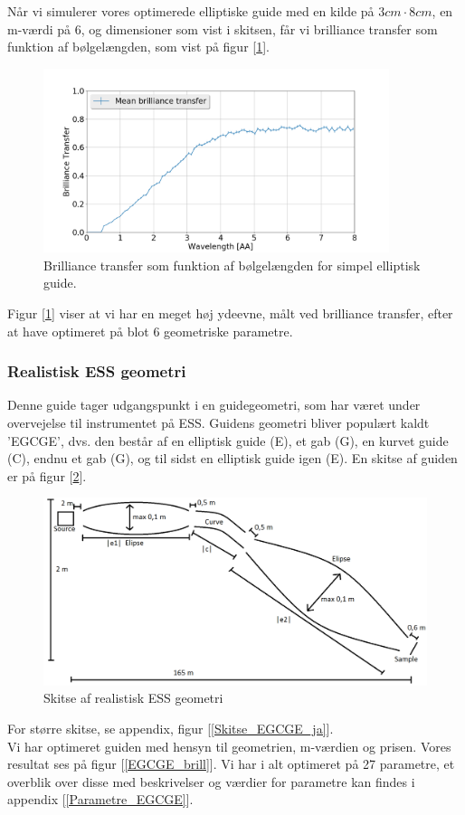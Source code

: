 \documentclass[12pt,oneside,a4paper]{article}
\begin{document}
{{{{{Når vi simulerer vores optimerede elliptiske guide med en kilde på $3cm\cdot8cm$, en m-værdi på 6, og dimensioner som vist i skitsen, får vi brilliance transfer som funktion af bølgelængden, som vist på figur [\ref{simpel_guide}].
\begin{figure}[H]
\centering
\includegraphics[width=0.9\textwidth]{optimized_mean_4.png}
\caption{Brilliance transfer som funktion af bølgelængden for simpel elliptisk guide.} \label{simpel_guide}
\end{figure}
Figur [\ref{simpel_guide}] viser at vi har en meget høj ydeevne, målt ved brilliance transfer, efter at have optimeret på blot 6 geometriske parametre. 


\subsubsection{Realistisk ESS geometri}
Denne guide tager udgangspunkt i en guidegeometri, som har været under overvejelse til instrumentet på ESS. Guidens geometri bliver populært kaldt 'EGCGE', dvs. den består af en elliptisk guide (E), et gab (G), en kurvet guide (C), endnu et gab (G), og til sidst en elliptisk guide igen (E). En skitse af guiden er på figur [\ref{EGCGE}].

\begin{figure}[H]
\centering
\includegraphics[width=1\textwidth]{EGCGE.png}
\caption{Skitse af realistisk ESS geometri} \label{EGCGE}
\end{figure}
For større skitse, se appendix, figur [\ref{Skitse_EGCGE_ja}]. \\
Vi har optimeret guiden med hensyn til geometrien, m-værdien og prisen. Vores resultat ses på figur [\ref{EGCGE_brill}]. Vi har i alt optimeret på 27 parametre, et overblik over disse med beskrivelser og værdier for parametre kan findes i appendix [\ref{Parametre_EGCGE}].

}}}}}
\end{document}
